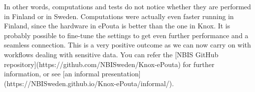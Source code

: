 In other words, computations and tests do not notice whether they are
performed in Finland or in Sweden. Computations were actually even
faster running in Finland, since the hardware in ePouta is better than
the one in Knox. It is probably possible to fine-tune the settings to
get even further performance and a seamless connection.  This is a
very positive outcome as we can now carry on with workflows dealing
with sensitive data. You can refer
the [NBIS GitHub repository](https://github.com/NBISweden/Knox-ePouta)
for further information, or
see
[an informal presentation](https://NBISweden.github.io/Knox-ePouta/informal/).
